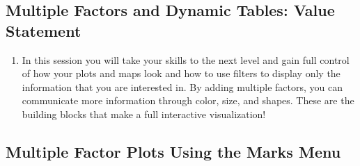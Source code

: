 \documentclass[
]{book}
\providecommand{\tightlist}{%
  \setlength{\itemsep}{0pt}\setlength{\parskip}{0pt}}
\begin{document}
\hypertarget{multiple-factors-and-dynamic-tables-value-statement}{%
\subsection{Multiple Factors and Dynamic Tables: Value Statement}\label{multiple-factors-and-dynamic-tables-value-statement}}

\begin{enumerate}
\def\labelenumi{\arabic{enumi}.}
\tightlist
\item
  In this session you will take your skills to the next level and gain full control of how your plots and maps look and how to use filters to display only the information that you are interested in. By adding multiple factors, you can communicate more information through color, size, and shapes. These are the building blocks that make a full interactive visualization!
\end{enumerate}

\hypertarget{multiple-factor-plots-using-the-marks-menu}{%
\subsection{Multiple Factor Plots Using the Marks Menu}\label{multiple-factor-plots-using-the-marks-menu}}
\end{document}
